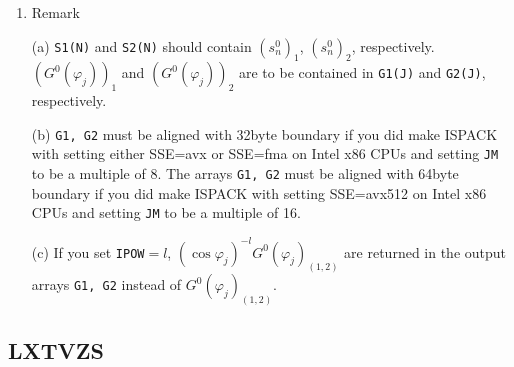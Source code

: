 \documentclass[a4paper]{scrartcl}
\begin{document}
\begin{enumerate}
\item Remark

(a) \texttt{S1(N)} and \texttt{S2(N)} should 
contain $(s^0_n)_1$, $(s^0_n)_2$, respectively.
$(G^0(\varphi_j))_1$ and 
$(G^0(\varphi_j))_2$ 
are to be contained in \texttt{G1(J)} and \texttt{G2(J)}, respectively.

(b) \texttt{G1, G2}
must be aligned with 32byte boundary
if you did make ISPACK with setting either SSE=avx or SSE=fma
on Intel x86 CPUs and setting \texttt{JM} to be a multiple of 8.
The arrays \texttt{G1, G2} must be aligned with 64byte boundary
if you did make ISPACK with setting SSE=avx512
on Intel x86 CPUs and setting \texttt{JM} to be a multiple of 16.

(c) If you set \texttt{IPOW}$=l$, 
$(\cos\varphi_j)^{-l}G^0(\varphi_j)_{(1,2)}$ are returned 
in the output arrays \texttt{G1, G2} instead of $G^0(\varphi_j)_{(1,2)}$.

\end{enumerate}


\subsection{LXTVZS}
\end{document}
